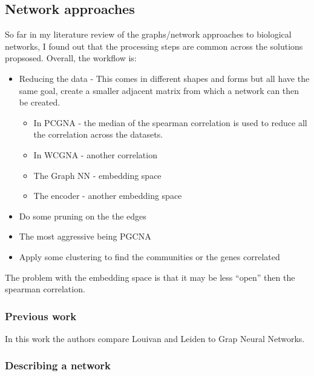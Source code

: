 
\subsection{Network approaches}

So far in my literature review of the graphs/network approaches to biological networks, I found out that the processing steps are common across the solutions propsosed. Overall, the workflow is:
\begin{itemize}
    \item Reducing the data - This comes in different shapes and forms but all have the same goal, create a smaller adjacent matrix from which a network can then be created.
    \begin{itemize}
        \item In PCGNA - the median of the spearman correlation is used to reduce all the correlation across the datasets.
        \item In WCGNA - another correlation
        \item The Graph NN - embedding space
        \item The encoder - another embedding space
    \end{itemize}
    \item Do some pruning on the the edges
    \item The most aggressive being PGCNA 
    \item Apply some clustering to find the communities or the genes correlated 
\end{itemize}


The problem with the embedding space is that it may be less “open” then the spearman correlation.


\subsubsection{Previous work}

In this work the authors \cite{Sobolevsky2022-di} compare Louivan \cite{} and Leiden to Grap Neural Networks.

\subsubsection{Describing a network}


